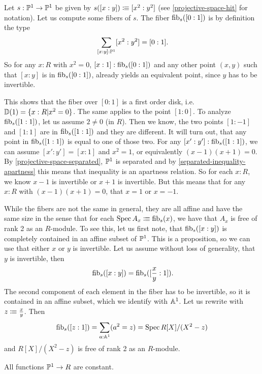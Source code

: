 \begin{example}
  Let $s:\mathbb{P}^1\to \mathbb{P}^1$ be given by $s([x:y])\vcentcolon\mspace{-1.2mu}\equiv [x^2:y^2]$
  (see \cref{projective-space-hit} for notation).
  Let us compute some fibers of $s$. The fiber $\mathrm{fib}_s([0:1])$ is
  by definition the type
  \[
    \sum_{[x:y]:\bP^1}[x^2:y^2]=[0:1]\rlap{.}
  \]
  So for any $x:R$ with $x^2=0$, $[x:1]:\mathrm{fib}_s([0:1])$  and
  any other point $(x,y)$ such that $[x:y]$ is in $\mathrm{fib}_s([0:1])$,
  already yields an equivalent point, since $y$ has to be invertible.

  This shows that the fiber over $[0:1]$ is a first order disk, i.e. $\mathbb{D}(1)=\{x:R|x^2=0\}$.
  The same applies to the point $[1:0]$.
  To analyze $\mathrm{fib}_s([1:1])$, let us assume $2\neq 0$ (in $R$).
  Then we know, the two points $[1:-1]$ and $[1:1]$ are in $\mathrm{fib}_s([1:1])$ and they are different.
  It will turn out, that any point in $\mathrm{fib}_s([1:1])$ is equal to one of those two.
  For any $[x':y']:\mathrm{fib}_s([1:1])$, we can assume $[x':y']=[x:1]$ and $x^2=1$, or equivalently $(x-1)(x+1)=0$.
  By \cref{projective-space-separated}, $\mathbb{P}^1$ is separated and by \cref{separated-inequality-apartness}
  this means that inequality is an apartness relation.
  So for each $x:R$, we know $x-1$ is invertible or $x+1$ is invertible.
  But this means that for any $x:R$ with $(x-1)(x+1)=0$, that $x=1$ or $x=-1$.

  While the fibers are not the same in general,
  they are all affine and have the same size in the sense that for each $\operatorname{Spec} A_x\vcentcolon\mspace{-1.2mu}\equiv \mathrm{fib}_s(x)$,
  we have that $A_x$ is free of rank 2 as an $R$-module.
  To see this, let us first note,
  that $\mathrm{fib}_s([x:y])$ is completely contained in an affine subset of $\mathbb{P}^1$.
  This is a proposition, so we can use that either $x$ or $y$ is invertible.
  Let us assume without loss of generality, that $y$ is invertible,
  then
  \[
    \fib_s([x:y])=\fib_s([\frac{x}{y}:1])
    \rlap{.}
  \]
  The second component of each element in the fiber has to be invertible,
  so it is contained in an affine subset, which we identify with $\mathbb{A}^1$.
  Let us rewrite with $z\vcentcolon\mspace{-1.2mu}\equiv \frac{x}{y}$.
  Then
  \[
    \mathrm{fib}_s([z:1])=\sum_{a:\mathbb{A}^1}(a^2=z)=\operatorname{Spec} R[X]/(X^2-z)
  \]
  and $R[X]/(X^2-z)$ is free of rank 2 as an $R$-module.
\end{example}

\begin{lemma}%
  \label{functions-on-projective-line-constant}
  All functions $\mathbb{P}^1 \to R$ are constant.
\end{lemma}

